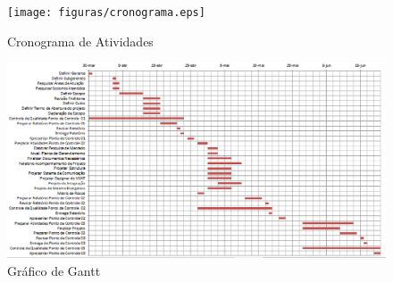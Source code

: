  \begin{figure}[ht]
	\centering
		\texttt{[image: figuras/cronograma.eps]}
	\caption{Cronograma de Atividades}
\end{figure}

 \begin{figure}[ht]
	\centering
		\includegraphics[keepaspectratio=true,scale=0.9,angle=90]{figuras/gantt.eps}
	\caption{Gráfico de Gantt}
\end{figure}


